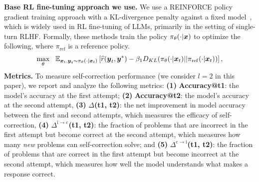 \textbf{Base RL fine-tuning approach we use.} We use a REINFORCE policy gradient training approach with a KL-divergence penalty against a fixed model~\citep{ahmadian2024back}, which is widely used in RL fine-tuning of LLMs, primarily in the setting of single-turn RLHF. Formally, these methods train the policy $\pi_{\theta}(\cdot|\boldsymbol{x})$ to optimize the following, where $\pi_\mathrm{ref}$ is a reference policy.
\begin{align}
    \label{eq:base_reinforce}
    \max_{\theta}~~ \mathbb{E}_{\boldsymbol{x}_t, \boldsymbol{y}_t \sim \pi_{\theta}(\cdot | \boldsymbol{x}_t)}\left[\widehat{r}(\boldsymbol{y}_t, \boldsymbol{y}^*) - \beta_1 D_{KL}(\pi_\theta(\cdot | \boldsymbol{x}_t) || \pi_\mathrm{ref}(\cdot | \boldsymbol{x}_t))\right],
\end{align}
\textbf{Metrics.} To measure self-correction performance (we consider $l=2$ in this paper), we report and analyze the following metrics: \textbf{(1)} \textbf{Accuracy@t1}: the model's accuracy at the first attempt; \textbf{(2)} \textbf{Accuracy@t2}: the model's accuracy at the second attempt, \textbf{(3)} \textbf{$\Delta$(t1, t2)}: the net improvement in model accuracy between the first and second attempts, which measures the efficacy of self-correction, \textbf{(4)} \textbf{$\Delta^{\mathrm{i} \rightarrow \mathrm{c}}$(t1, t2)}: the fraction of problems that are incorrect in the first attempt but become correct at the second attempt, which measures how many \emph{new} problems can self-correction solve; and \textbf{(5)} \textbf{$\Delta^{\mathrm{c} \rightarrow \mathrm{i}}$(t1, t2)}: the fraction of problems that are correct in the first attempt but become incorrect at the second attempt, which measures how well the model understands what makes a response correct.




